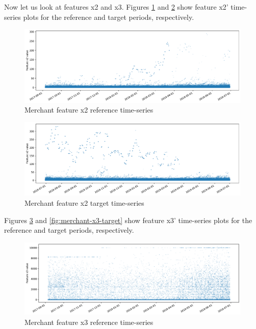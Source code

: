 Now let us look at features x2 and x3. Figures \ref{fig:merchant-x2-reference} and \ref{fig:merchant-x2-target} show feature x2' time-series plots for the reference and target periods, respectively.
\begin{figure}[!htb]
    \begin{center}
      \includegraphics[scale=0.5]{figures/merchant-x2-reference.pdf}
      \caption{Merchant feature x2 reference time-series}
      \label{fig:merchant-x2-reference}
    \end{center}
\end{figure}
\begin{figure}[!htb]
    \begin{center}
      \includegraphics[scale=0.5]{figures/merchant-x2-target.pdf}
      \caption{Merchant feature x2 target time-series}
      \label{fig:merchant-x2-target}
    \end{center}
\end{figure}
Figures \ref{fig:merchant-x3-reference} and \ref{fig:merchant-x3-target} show feature x3' time-series plots for the reference and target periods, respectively.
\begin{figure}[!htb]
    \begin{center}
      \includegraphics[scale=0.5]{figures/merchant-x3-reference.pdf}
      \caption{Merchant feature x3 reference time-series}
      \label{fig:merchant-x3-reference}
    \end{center}
\end{figure}
